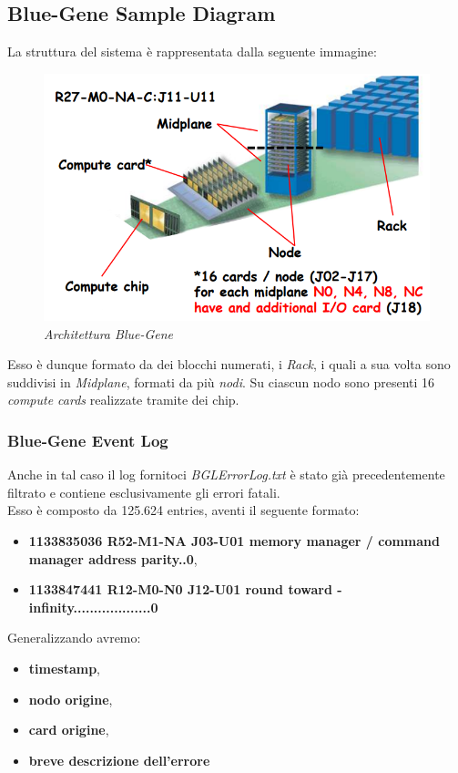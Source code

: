 \subsection{Blue-Gene Sample Diagram}
La struttura del sistema è rappresentata dalla seguente immagine:
\begin{figure}[H]
	\centering
	\includegraphics[width=\textwidth]{img/hw6/BG.png}
	\caption{\textit{Architettura Blue-Gene}}
\end{figure}
Esso è dunque formato da dei blocchi numerati, i \textit{Rack}, i quali a sua volta sono suddivisi in \textit{Midplane}, formati da più \textit{nodi}. Su ciascun nodo sono presenti 16 \textit{compute cards} realizzate tramite dei chip.
\subsubsection{Blue-Gene Event Log}
Anche in tal caso il log fornitoci \textit{BGLErrorLog.txt} è stato già precedentemente filtrato e contiene esclusivamente gli errori fatali.
\\
Esso è composto da 125.624 entries, aventi il seguente formato:
\begin{itemize}
	\item \textbf{1133835036 R52-M1-NA J03-U01  memory manager / command manager address parity..0},
	\item \textbf{1133847441 R12-M0-N0 J12-U01  round toward -infinity...................0}
\end{itemize}
Generalizzando avremo:
\begin{itemize}
	\item \textbf{timestamp},
	\item \textbf{nodo origine},
	\item \textbf{card origine},
	\item \textbf{breve descrizione dell'errore}
\end{itemize}


